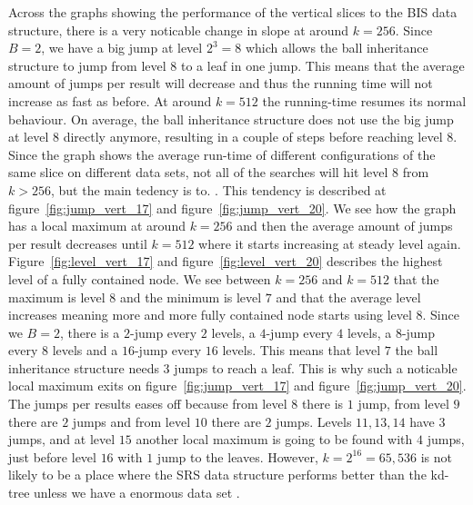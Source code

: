 Across the graphs showing the performance of the vertical slices to the BIS data structure, there is a very noticable change in slope at around $k=256$. Since $B=2$, we have a big jump at level $2^3 = 8$ which allows the ball inheritance structure to jump from level $8$ to a leaf in one jump. This means that the average amount of jumps per result will decrease and thus the running time will not increase as fast as before. At around $k=512$ the running-time resumes its normal behaviour. On average, the ball inheritance structure does not use the big jump at level $8$ directly anymore, resulting in a couple of steps before reaching level $8$. Since the graph shows the average run-time of different configurations of the same slice on different data sets, not all of the searches will hit level $8$ from $k>256$, but the main tedency is to. . This tendency is described at figure~\ref{fig:jump_vert_17} and figure~\ref{fig:jump_vert_20}. We see how the graph has a local maximum at around $k=256$ and then the average amount of jumps per result decreases until $k=512$ where it starts increasing at steady level again. Figure~\ref{fig:level_vert_17} and figure~\ref{fig:level_vert_20} describes the highest level of a fully contained node. We see between $k=256$ and $k=512$ that the maximum is level $8$ and the minimum is level $7$ and that the average level increases meaning more and more fully contained node starts using level $8$. Since we $B=2$, there is a $2$-jump every $2$ levels, a $4$-jump every $4$ levels, a $8$-jump every $8$ levels and a $16$-jump every $16$ levels. This means that level $7$ the ball inheritance structure needs $3$ jumps to reach a leaf. This is why such a noticable local maximum exits on figure~\ref{fig:jump_vert_17} and figure~\ref{fig:jump_vert_20}. The jumps per results eases off because from level $8$ there is $1$ jump, from level $9$ there are $2$ jumps and from level $10$ there are $2$ jumps. Levels $11, 13, 14$ have $3$ jumps, and at level $15$ another local maximum is going to be found with $4$ jumps, just before level $16$ with $1$ jump to the leaves. However, $k=2^{16}=65,536$ is not likely to be a place where the SRS data structure performs better than the kd-tree unless we have a enormous data set . 


